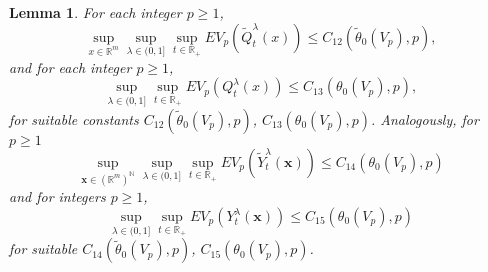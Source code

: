 \documentclass[a4paper,draft]{article}
\newtheorem{lemma}[theorem]{Lemma}
\begin{document}
\begin{lemma}\label{moments} For each integer $p\geq 1$,
$$
\sup_{x\in\mathbb{R}^m}\sup_{\lambda\in (0,1]}\sup_{t\in\mathbb{R}_+}EV_p(\tilde{Q}^{\lambda}_t(x))
\leq C_{12}(\tilde{\theta}_0(V_p),p),
$$
and for each integer $p\geq 1$,
$$
\sup_{\lambda\in (0,1]}\sup_{t\in\mathbb{R}_+}EV_p({Q}^{\lambda}_t({x}))
\leq C_{13}(\theta_0(V_p),p),
$$
for suitable constants $C_{12}(\tilde{\theta}_0(V_p),p)$, $C_{13}(\theta_0(V_p),p)$.
Analogously, for $p\geq 1$
$$
\sup_{\mathbf{x}\in(\mathbb{R}^m)^{\mathbb{N}}}\sup_{\lambda\in (0,1]}\sup_{t\in\mathbb{R}_+}EV_p(\tilde{Y}^{\lambda}_t(\mathbf{x}))
\leq C_{14}({\theta}_0(V_p),p)
$$
and for integers $p\geq 1$,
$$
\sup_{\lambda\in (0,1]}\sup_{t\in\mathbb{R}_+}EV_p({Y}^{\lambda}_t(\mathbf{x}))
\leq C_{15}(\theta_0(V_p),p)
$$
for suitable $C_{14}(\tilde{\theta}_0(V_p),p)$, $C_{15}(\theta_0(V_p),p)$.
\end{lemma}
\end{document}
